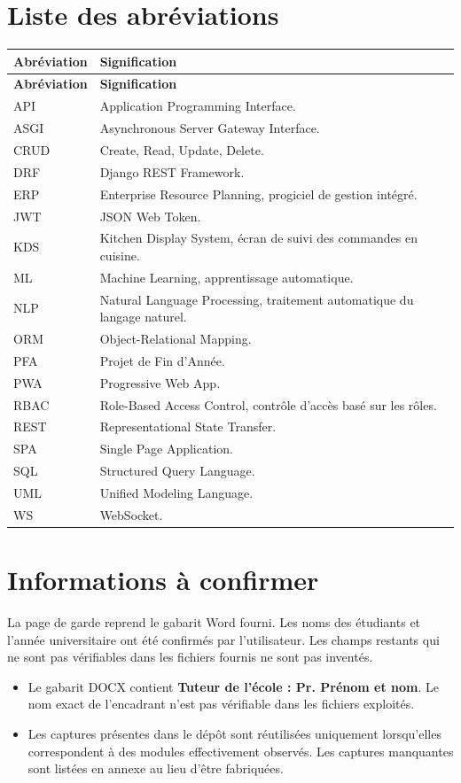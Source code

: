 \chapter*{Liste des abréviations}
\begin{longtable}{p{3cm}p{11cm}}
\toprule
\textbf{Abréviation} & \textbf{Signification} \\
\midrule
\endfirsthead
\toprule
\textbf{Abréviation} & \textbf{Signification} \\
\midrule
\endhead
API & Application Programming Interface. \\
ASGI & Asynchronous Server Gateway Interface. \\
CRUD & Create, Read, Update, Delete. \\
DRF & Django REST Framework. \\
ERP & Enterprise Resource Planning, progiciel de gestion intégré. \\
JWT & JSON Web Token. \\
KDS & Kitchen Display System, écran de suivi des commandes en cuisine. \\
ML & Machine Learning, apprentissage automatique. \\
NLP & Natural Language Processing, traitement automatique du langage naturel. \\
ORM & Object-Relational Mapping. \\
PFA & Projet de Fin d'Année. \\
PWA & Progressive Web App. \\
RBAC & Role-Based Access Control, contrôle d'accès basé sur les rôles. \\
REST & Representational State Transfer. \\
SPA & Single Page Application. \\
SQL & Structured Query Language. \\
UML & Unified Modeling Language. \\
WS & WebSocket. \\
\bottomrule
\end{longtable}

\chapter*{Informations à confirmer}
La page de garde reprend le gabarit Word fourni. Les noms des étudiants et l'année universitaire ont été confirmés par l'utilisateur. Les champs restants qui ne sont pas vérifiables dans les fichiers fournis ne sont pas inventés.

\begin{itemize}
  \item Le gabarit DOCX contient \textbf{Tuteur de l'école : Pr. Prénom et nom}. Le nom exact de l'encadrant n'est pas vérifiable dans les fichiers exploités.
  \item Les captures présentes dans le dépôt sont réutilisées uniquement lorsqu'elles correspondent à des modules effectivement observés. Les captures manquantes sont listées en annexe au lieu d'être fabriquées.
\end{itemize}
